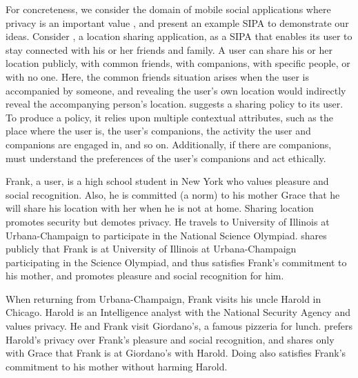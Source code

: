 For concreteness, we consider the domain of mobile social applications where privacy is an important value \citep{spiekermann2009enggprivacy, Taylor-2002-PrivacyAutonomy}, and present an example SIPA to demonstrate our ideas. 
Consider \locationapp, a location sharing application, as a SIPA that enables its user to stay connected with his or her friends and family. 
A \locationapp user can share his or her location publicly, with common friends, with companions, with specific people, or with no one. 
Here, the common friends situation arises when the user is accompanied by someone, and revealing the user's own location would indirectly reveal the accompanying person's location. 
\locationapp suggests a sharing policy to its user. 
To produce a policy, it relies upon multiple contextual attributes, such as the place where the user is, the user's companions, the activity the user and companions are engaged in, and so on. 
Additionally, if there are companions, \locationapp must understand the
preferences of the user's companions and act ethically.

\begin{example}[Olympiad] 
\label{ex:frank-safety} 
Frank, a \locationapp user, is a high school student in New York who values pleasure and social recognition. 
Also, he is committed (a norm) to his mother Grace that he will share his location with her when he is not at home. 
Sharing location promotes security but demotes privacy. 
He travels to University of Illinois at Urbana-Champaign to participate in
the National Science Olympiad. 
\locationapp shares publicly that Frank is at University of Illinois at Urbana-Champaign participating in the Science Olympiad, and thus satisfies Frank's commitment to his mother, and promotes pleasure and social recognition for him. 
\end{example}

\begin{example} 
\label{ex:harold-privacy} 
When returning from Urbana-Champaign, Frank visits his uncle Harold in Chicago. 
Harold is an Intelligence analyst with the National Security Agency and values privacy. 
He and Frank visit Giordano's, a famous pizzeria for lunch. 
\locationapp prefers Harold's privacy over Frank's pleasure and social recognition, and shares only with Grace that Frank is at Giordano's with Harold. 
Doing also satisfies Frank's commitment to his mother without harming Harold. 
\end{example}

